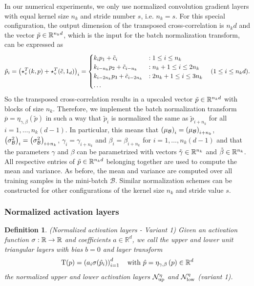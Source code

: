\documentclass[twoside,a4paper]{article}
\newtheorem{definition}{Definition}
\begin{document}
In our numerical experiments, we only use normalized convolution gradient layers with equal 
kernel size $n_k$ and stride number $s$, i.e. $n_k = s$. For this special configuration,
the output dimension of the transposed cross-correlation is $n_k d$ and
the vector $\tilde{p} \in \mathbb{R}^{n_k d}$, which is the input for the
batch normalization transform, can be expressed as
\begin{equation*}
	\tilde{p}_i = \left( \star_{\text{v}}^T(k,p) + \star_{\text{v}}^T(\tilde{c},1_d) \right)_i 
	= \begin{cases}
		k_i p_1 + \tilde{c}_i &: 1 \leq i \leq n_k \\
		k_{i - n_k} p_2 + \tilde{c}_{i - n_k} &: n_k+1 \leq i \leq 2n_k \\
		k_{i - 2n_k} p_3 + \tilde{c}_{i - 2n_k} &: 2n_k+1 \leq i \leq 3n_k \\
		\dots
	\end{cases} \quad (1 \leq i \leq n_k d)
	.
\end{equation*}
So the transposed cross-correlation results in a upscaled vector $\tilde{p} \in \mathbb{R}^{n_k d}$ with blocks of size $n_k$.
Therefore, we implement the batch normalization transform 
$\overline{p} = \eta_{\gamma, \beta}(\tilde{p})$ in such a way that $\tilde{p}_i$ is
normalized the same as $\tilde{p}_{i+n_k}$ for all $i = 1, \dots, n_k (d-1)$. In particular, this means that
$\left( \mu_\mathcal{B} \right)_i = \left( \mu_\mathcal{B} \right)_{i+n_k}$, 
$\left( \sigma^2_\mathcal{B} \right)_i = \left( \sigma^2_\mathcal{B} \right)_{i+n_k}$, 
$\gamma_i = \gamma_{i+n_k}$ and $\beta_i = \beta_{i+n_k}$ for $i = 1, \dots, n_k (d-1)$
and that the parameters $\gamma$ and $\beta$ can be parametrized with vectors
$\tilde{\gamma} \in \mathbb{R}^{n_k}$ and $\tilde{\beta} \in \mathbb{R}^{n_k}$. All respective entries of $\tilde{p} \in \mathbb{R}^{n_k d}$ 
belonging together are used to compute the mean and variance.
As before, the mean and variance are computed over all training samples in the mini-batch $\mathcal{B}$.
Similar normalization schemes can be constructed for other configurations of the 
kernel size $n_k$ and stride value $s$.

\subsubsection{Normalized activation layers}

\begin{definition}\label{def_norm_activation_layer_1}
	(Normalized activation layers - Variant 1)
	Given an activation function $\sigma : \mathbb{R} \to \mathbb{R}$ and coefficients $a \in \mathbb{R}^d$, 
	we call the upper and lower unit triangular layers with bias $b=0$ and layer transform
	\begin{equation*}
		\mathrm{T}(p) = \left( a_i \sigma(\hat{p}_i) \right)_{i=1}^d
		\quad \text{with } \hat{p} = \eta_{\gamma, \beta} \left( p \right) \in \mathbb{R}^d
	\end{equation*}
	the normalized upper and lower activation layers $\mathcal{N}_{\text{up}}^\eta$ and $\mathcal{N}_{\text{low}}^\eta$
	(variant 1).
\end{definition}
\end{document}
